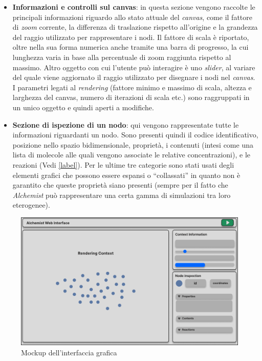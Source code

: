 \begin{itemize}
	\item \textbf{Informazioni e controlli sul canvas}: in questa sezione vengono raccolte le principali informazioni riguardo allo stato attuale del \textit{canvas}, come il fattore di \textit{zoom} corrente, la differenza di traslazione rispetto all'origine e la grandezza del raggio utilizzato per rappresentare i nodi. Il fattore di scala è riportato, oltre nella sua forma numerica anche tramite una barra di progresso, la cui lunghezza varia in base alla percentuale di zoom raggiunta rispetto al massimo. Altro oggetto con cui l'utente può interagire è uno \textit{slider}, al variare del quale viene aggiornato il raggio utilizzato per disegnare i nodi nel \textit{canvas}. I parametri legati al \textit{rendering} (fattore minimo e massimo di scala, altezza e larghezza del canvas, numero di iterazioni di scala etc.) sono raggruppati in un unico oggetto e quindi aperti a modifiche.
	\item \textbf{Sezione di ispezione di un nodo}\label{item:node-inspection}: qui vengono rappresentate tutte le informazioni riguardanti un nodo. Sono presenti quindi il codice identificativo, posizione nello spazio bidimensionale, proprietà, i contenuti (intesi come una lista di molecole alle quali vengono associate le relative concentrazioni), e le reazioni (Vedi \ref{label}). Per le ultime tre categorie sono stati usati degli elementi grafici che possono essere espansi o ``collassati'' in quanto non è garantito che queste proprietà siano presenti (sempre per il fatto che \textit{Alchemist} può rappresentare una certa gamma di simulazioni tra loro eterogenee).
\end{itemize}

\begin{figure}[htb]
	\centering
	\includegraphics[scale=0.65]{imgs/Interface_Layout.pdf}
	\caption{Mockup dell'interfaccia grafica}
	\label{fig:interface-layout}
\end{figure}

